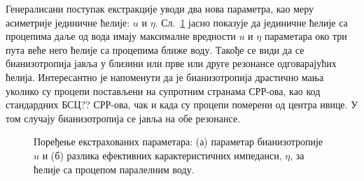 Генералисани поступак екстракције уводи два нова параметра, као меру асиметрије јединичне ћелије: $u$ и $\eta$. Сл.~\ref{fig12} јасно показује да јединичне ћелије са процепима даље од вода имају максималне вредности $u$ и $\eta$ параметара око три пута веће него ћелије са процепима ближе воду. Такође се види да се бианизотропија јавља у близини или прве или друге резонансе одговарајућих ћелија. Интересантно је напоменути да је бианизотропија драстично мања уколико су процепи постављени на супротним странама СРР-ова, као код стандардних БСЦ?? СРР-ова, чак и када су процепи померени од центра ивице. У том случају бианизотропија се јавља на обе резонансе.
\begin{figure}[!t]
\centering
{}\hfill
{}
\caption{Поређење екстрахованих параметара: (а) параметар бианизотропије $u$ и (б) разлика ефективних карактеристичних импеданси, $\eta$, за ћелије са процепом паралелним воду.}
\label{fig12}
\end{figure} 

